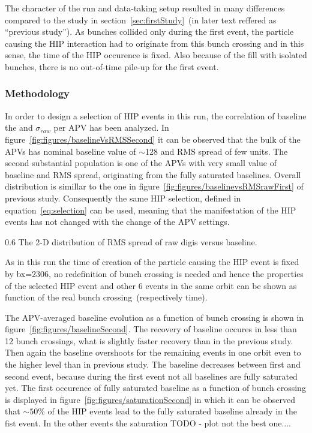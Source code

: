 The character of the run and data-taking setup resulted in many differences compared to the study in section~\ref{sec:firstStudy}~(in later text reffered as ``previous study''). As bunches collided only during the first event, the particle causing the HIP interaction had to originate from this bunch crossing and in this sense, the time of the HIP occurence is fixed. Also because of the fill with isolated bunches, there is no out-of-time pile-up for the first event.

\subsubsection{Methodology}

In order to design a selection of HIP events in this run, the correlation of baseline the and $\sigma_{raw}$ per APV has been analyzed. In figure~\ref{fig:figures/baselineVsRMSSecond} it can be observed that the bulk of the APVs has nominal baseline value of $\sim$128 and RMS spread of few units. The second substantial population is one of the APVs with very small value of baseline and RMS spread, originating from the fully saturated baselines. Overall distribution is simillar to the one in figure~\ref{fig:figures/baselinevsRMSrawFirst} of previous study. Consequently the same HIP selection, defined in equation~\ref{eq:selection} can be used, meaning that the manifestation of the HIP events has not changed with the change of the APV settings.

                 {0.6}       %
                 {The 2-D distribution of RMS spread of raw digis versus baseline. } %

As in this run the time of creation of the particle causing the HIP event is fixed by bx=2306, no redefinition of bunch crossing is needed and hence the properties of the selected HIP event and other 6 events in the same orbit can be shown as function of the real bunch crossing~(respectively time).

The APV-averaged baseline evolution as a function of bunch crossing is shown in figure~\ref{fig:figures/baselineSecond}. The recovery of baseline occures in less than 12 bunch crossings, what is slightly faster recovery than in the previous study. Then again the baseline overshoots for the remaining events in one orbit even to the higher level than in previous study. The baseline decreases between first and second event, because during the first event not all baselines are fully saturated yet. The first occurence of fully saturated baseline as a function of bunch crossing is displayed in figure~\ref{fig:figures/saturationSecond} in which it can be observed that $\sim 50\%$ of the HIP events lead to the fully saturated baseline already in the fist event. In the other events the saturation TODO - plot not the best one....

